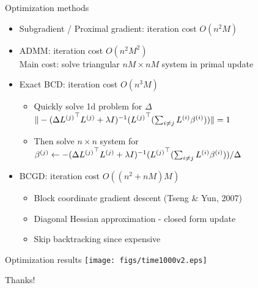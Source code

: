 \begin{frame}{Optimization methods}
\begin{itemize}
\item Subgradient / Proximal gradient: iteration cost $O(n^2M)$
\item ADMM: iteration cost $O(n^2M^2)$ \\
Main cost: solve triangular $nM \times nM$ system in primal update
\item Exact BCD: iteration cost $O(n^3 M)$ \\
\begin{itemize}
\item Quickly solve 1d problem for $\Delta$
$\|-(\Delta {L^{(j)}}^\top{L^{(j)}} + \lambda I)^{-1}({L^{(j)}}^\top (\sum_{i\neq j}{L^{(i)}} {\beta^{(i)}}))\|=1$
\item Then solve $n \times n$ system for 
${\beta^{(j)}} \leftarrow -(\Delta {L^{(j)}}^\top{L^{(j)}}+\lambda I)^{-1}({L^{(j)}}^\top(\sum_{i\neq j}{L^{(i)}} {\beta^{(i)}}))/\Delta$
\end{itemize}
\item BCGD: iteration cost $O((n^2+nM)M)$
\begin{itemize}
\item Block coordinate gradient descent (Tseng \& Yun, 2007) 
\item Diagonal Hessian approximation - closed form update
\item Skip backtracking since expensive
\end{itemize}
\end{itemize}
\end{frame}

\begin{frame}{Optimization results}
\texttt{[image: figs/time1000v2.eps]}
\end{frame}

\begin{frame}{}
\begin{center}
Thanks!
\end{center}
\end{frame}
